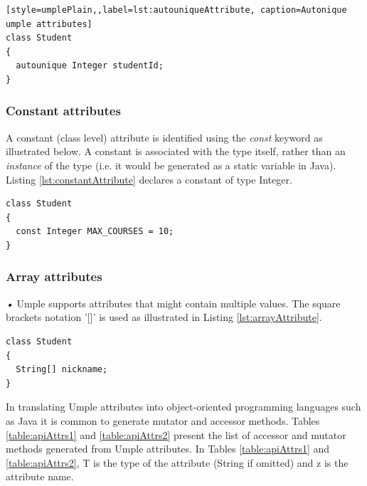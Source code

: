 \begin{lstlisting}[style=umplePlain,,label=lst:autouniqueAttribute, caption=Autonique umple attributes]
class Student 
{
  autounique Integer studentId;
}
\end{lstlisting}

\subsubsection{Constant attributes}
A constant (class level) attribute is identified using the \textit{const} keyword as illustrated below. A constant is associated with the type itself, rather than an \textit{instance} of the type (i.e. it would be generated as a static variable in Java). Listing \ref{lst:constantAttribute} declares a constant of type Integer. 

\begin{lstlisting}[style=umplePlain,label=lst:constantAttribute, caption=Constants in Umple]
class Student 
{
  const Integer MAX_COURSES = 10;
}
\end{lstlisting}

\subsubsection{Array attributes}\emph{•}
Umple supports attributes that might contain multiple values. The square brackets notation '[]' is used as illustrated in Listing \ref{lst:arrayAttribute}.

\begin{lstlisting}[style=umplePlain,label=lst:arrayAttribute, caption=Array attributes]
class Student 
{
  String[] nickname;
}
\end{lstlisting}

In translating Umple attributes into object-oriented programming languages such as Java it is common to generate mutator and accessor methods. Tables \ref{table:apiAttrs1} and \ref{table:apiAttrs2} present the list of accessor and mutator methods generated from Umple attributes. In Tables \ref{table:apiAttrs1} and \ref{table:apiAttrs2}, T is the type of the attribute (String if omitted) and z is the attribute name.	

